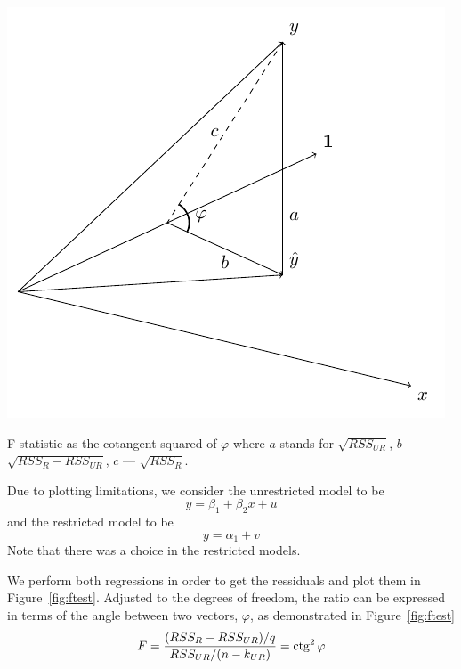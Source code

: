 \begin{marginfigure}
\includegraphics[scale=0.55]{figures/04_ftest.pdf}
\caption{F-statistic as the cotangent squared of $\varphi$
where $a$ stands for $\sqrt{RSS_{UR}}$, $b$ — $\sqrt{RSS_{R} -RSS_{UR}}$,
$c$ — $\sqrt{RSS_{R}}$.}
\label{fig:ftest}
\end{marginfigure}

Due to plotting limitations, we consider the unrestricted model to be
\[
y = \beta_1 + \beta_2 x + u
\]
and the restricted model to be
\[
y = \alpha_1 + v
\]
Note that there was a choice in the restricted models.


We perform both regressions in order to get the ressiduals and plot them
in Figure~\ref{fig:ftest}.
Adjusted to the degrees of freedom, the ratio can be expressed in terms of the
angle between two vectors, $\varphi$, as demonstrated in Figure~\ref{fig:ftest}
\[
F = \frac{(RSS_{R} - RSS_{UR})/q}{RSS_{UR}/(n-k_{UR})} = \operatorname{ctg}^2 \varphi
\]
